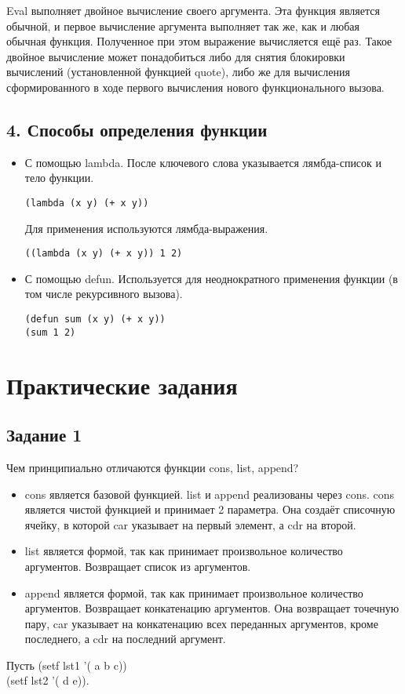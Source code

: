 Eval выполняет двойное  вычисление своего аргумента. Эта функция является обычной, и первое  вычисление аргумента выполняет так же, как и любая обычная функция.  Полученное при этом выражение вычисляется ещё раз. Такое двойное  вычисление может понадобиться либо для снятия блокировки вычислений (установленной функцией quote), либо же для вычисления сформированного в ходе первого вычисления нового функционального вызова.

\subsection*{4. Способы определения функции}
\begin{itemize}
	\item С помощью lambda. После ключевого слова указывается лямбда-список и тело функции. 
	\begin{lstlisting}
(lambda (x y) (+ x y))
	\end{lstlisting}
	Для применения используются лямбда-выражения.
	\begin{lstlisting}
((lambda (x y) (+ x y)) 1 2)
	\end{lstlisting}
	\item С помощью defun. Используется для неоднократного применения функции (в том числе рекурсивного вызова).
	\begin{lstlisting}
(defun sum (x y) (+ x y))
(sum 1 2)
	\end{lstlisting}

\end{itemize}

\newpage
\section*{Практические задания}

\subsection*{Задание 1}

Чем принципиально отличаются функции cons, list, append?

\begin{itemize}
\item cons является базовой функцией. list и append реализованы через cons. cons является чистой функцией и принимает 2 параметра. Она создаёт списочную ячейку, в которой car указывает на первый элемент, а cdr на второй.

\item list является формой, так как принимает произвольное количество аргументов. Возвращает список из аргументов.

\item append является формой, так как принимает произвольное количество аргументов. Возвращает конкатенацию аргументов. Она возвращает точечную пару, car указывает на конкатенацию всех переданных аргументов, кроме последнего, а cdr на последний аргумент.
\end{itemize}
Пусть (setf lst1 '( a b c)) \\
(setf lst2 '( d e)). 

